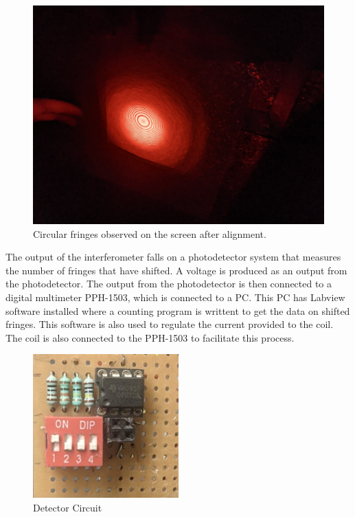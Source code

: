 \begin{figure}
	\centering
	\includegraphics[width=0.7\linewidth]{SGCAM_20230117_144255387}
	\caption{Circular fringes observed on the screen after alignment.}
	\label{fig:fringes}
\end{figure}
The output of the interferometer falls on a photodetector system that measures the number of fringes that have shifted. A voltage is produced as an output from the photodetector. The output from the photodetector is then connected to a digital multimeter PPH-1503, which is connected to a PC. This PC has Labview software installed where a counting program is writtent to get the data on shifted fringes. This software is also used to regulate the current provided to the coil. The coil is also connected to the PPH-1503 to facilitate this process.


\begin{figure}[H]
	\centering
	\includegraphics[width=0.5\textwidth]{circuit.jpeg}
	\caption{Detector Circuit}
	\label{fig:flow around cylinder}
\end{figure}

